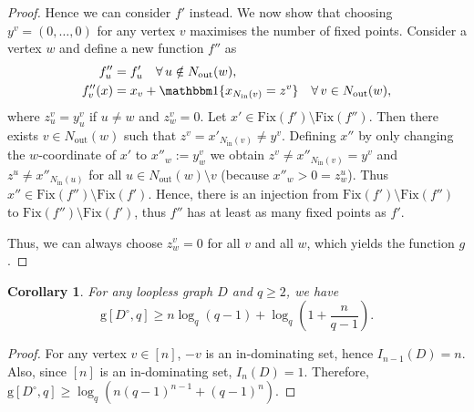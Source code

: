 \documentclass[a4paper, 11pt]{book}
\numberwithin{equation}{section}
\theoremstyle{plain}
\newtheorem{corollary}	[equation]	{Corollary}
\newcommand{\loopfull}[1]{{#1^\circ}}
\newcommand{\neighbourhood}{N}
\newcommand{\inn}[1]{#1_\mathrm{in}}
\newcommand{\out}[1]{#1_\mathrm{out}}
\newcommand{\NIn}{\inn{\neighbourhood}}
\newcommand{\NOut}{\out{\neighbourhood}}
\newcommand{\Fix}{\mathrm{Fix}}
\newcommand{\guessing}{\mathrm{g}}
\renewcommand{\(}{\ldbrack}
\renewcommand{\)}{\rdbrack}
\newcommand{\one}[1]{{\mathbbm 1}\{ #1 \}}
\begin{document}
\begin{proof}
Hence we can consider $f'$ instead. We now show that choosing $y^v = (0,\dots,0)$ for any vertex $v$ maximises the number of fixed points. Consider a vertex $w$ and define a new function $f''$ as
\begin{align*}
	f''_u &= f'_u \quad \forall\, u \notin \NOut(w),\\
	f''_v(x) &= x_v + \one{x_{\NIn(v)} = z^v} \quad \forall\, v \in \NOut(w),
\end{align*}
where $z^v_u = y^v_u$ if $u \ne w$ and $z^v_w = 0$. 
Let $x' \in \Fix(f') \setminus \Fix(f'')$. Then there exists $v \in \NOut(w)$ such that $z^v = x'_{\NIn(v)} \ne y^v$. Defining $x''$ by only changing the $w$-coordinate of $x'$ to $x''_w := y^v_w$ we obtain $z^v \ne x''_{\NIn(v)} = y^v$ and $z^u \ne x''_{\NIn(u)}$ for all $u \in \NOut(w) \setminus v$ (because $x''_w > 0 = z^u_w$). Thus $x'' \in \Fix(f'') \setminus \Fix(f')$. Hence, there is an injection from $\Fix(f') \setminus \Fix(f'')$ to $\Fix(f'') \setminus \Fix(f')$, thus $f''$ has at least as many fixed points as $f'$.

Thus, we can always choose $z^v_w = 0$ for all $v$ and all $w$, which yields the function $g$. 
\end{proof}


\begin{corollary} \label{cor:g_strict_loops}
For any loopless graph $D$ and $q\ge 2$, we have 
\[
	\guessing[\loopfull{D}, q] \ge n \log_q (q-1) + \log_q \left(1 + \frac{n}{q-1} \right).
\]
\end{corollary}

\begin{proof}
For any vertex $v \in [n]$, $-v$ is an in-dominating set, hence $I_{n-1}(D) = n$. Also, since $[n]$ is an in-dominating set, $I_n(D) = 1$. Therefore, $\guessing[\loopfull{D}, q] \ge \log_q \left( n(q-1)^{n-1} + (q-1)^n \right)$.
\end{proof}
\end{document}
